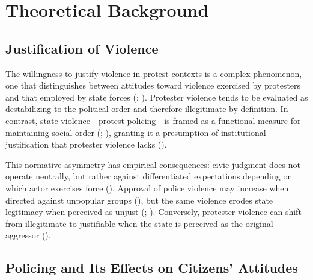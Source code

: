 \documentclass[
  13pt,
]{article}
\begin{document}
\section{Theoretical Background}\label{theoretical-background}

\subsection{Justification of Violence}\label{justification-of-violence}

The willingness to justify violence in protest contexts is a complex
phenomenon, one that distinguishes between attitudes toward violence
exercised by protesters and that employed by state forces
(;
). Protester violence tends to be evaluated as destabilizing to the
political order and therefore illegitimate by definition. In contrast,
state violence---protest policing---is framed as a functional measure
for maintaining social order
(;
), granting it a
presumption of institutional justification that protester violence lacks
().

This normative asymmetry has empirical consequences: civic judgment does
not operate neutrally, but rather against differentiated expectations
depending on which actor exercises force
(). Approval of police
violence may increase when directed against unpopular groups
(), but the same
violence erodes state legitimacy when perceived as unjust
(;
).
Conversely, protester violence can shift from illegitimate to
justifiable when the state is perceived as the original aggressor
().

\subsection{Policing and Its Effects on Citizens'
Attitudes}\label{policing-and-its-effects-on-citizens-attitudes}
\end{document}
